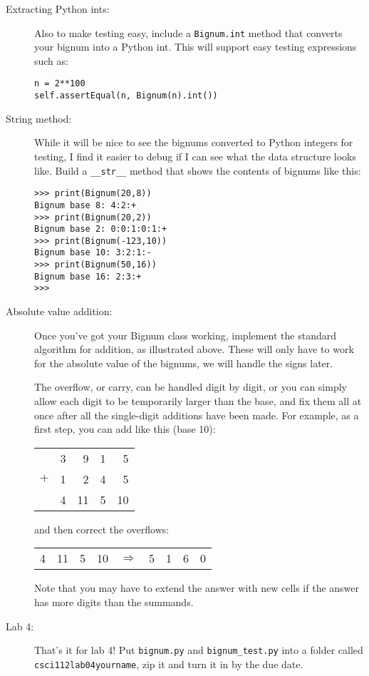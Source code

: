 \documentclass{article}
\begin{document}
\begin{description}
\item[Extracting Python ints:]
Also to make testing easy, include a \lstinline{Bignum.int} method that
converts your bignum into a Python int.  This will support easy testing
expressions such as:
\begin{lstlisting}
n = 2**100
self.assertEqual(n, Bignum(n).int())
\end{lstlisting}

\item[String method:]
While it will be nice to see the bignums converted to Python integers for 
testing, 
I find it easier to debug if I can see what the data structure looks like.
Build a \lstinline{__str__} method that shows the contents of bignums like this:
\begin{lstlisting}
>>> print(Bignum(20,8))
Bignum base 8: 4:2:+
>>> print(Bignum(20,2))
Bignum base 2: 0:0:1:0:1:+
>>> print(Bignum(-123,10))
Bignum base 10: 3:2:1:-
>>> print(Bignum(50,16))
Bignum base 16: 2:3:+
>>> 
\end{lstlisting}

\item[Absolute value addition:] 
Once you've got your Bignum class
working, 
implement the standard algorithm for addition, as illustrated
above.  These will only have to work for the absolute value of the bignums,
we will handle the signs later.  

The overflow, or carry, can be handled digit by digit, or you can simply
allow each digit to be temporarily larger than the base, and fix them all
at once after all the single-digit additions have been made.  For example,
as a first step, you can add like this (base 10):

\begin{tabular}{rrrrr}
  &3 &9 &1 &5\\
$+$ &1 &2 &4 &5\\
\hline
  &4 &11 &5 &10
\end{tabular}\hfill and then correct the overflows: \hfill
\begin{tabular}{rrrrcrrrr}
4 & 11 & 5 & 10 & $\Rightarrow$ &5 & 1 & 6 & 0
\end{tabular}

Note that you may have to extend the answer with new cells if the
answer has more digits than the summands.

\item[Lab 4:] That's it for lab 4!  Put {\tt bignum.py} and 
{\tt bignum\_test.py} into a folder called {\tt csci112lab04yourname},
zip it and turn it in by the due date.


\end{description}
\end{document}
